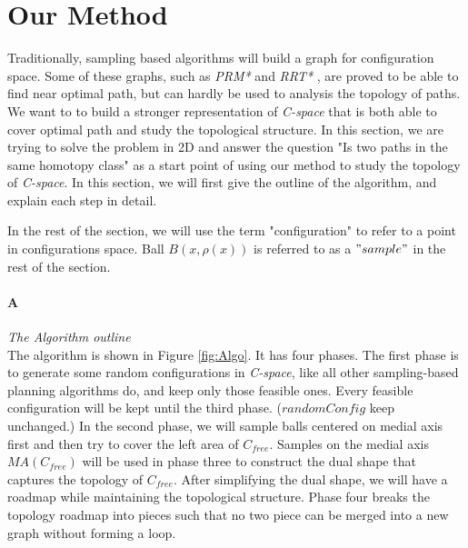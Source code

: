 \documentclass[11pt]{article}
\begin{document}
%

\section{Our Method}\label{method} 

\indent \indent Traditionally, sampling based algorithms will build a graph for configuration space. Some of these graphs, such as \emph{PRM*} and \emph{RRT*} \cite{prmstar}, are proved to be able to find near optimal path, but can hardly be used to analysis the topology of paths. We want to to build a stronger representation of \emph{C-space} that is both able to cover optimal path and study the topological structure. In this section, we are trying to solve the problem in 2D and answer the question "Is two paths in the same homotopy class" as a start point of using our method to study the topology of \emph{C-space}. In this section, we will first give the outline of the algorithm, and explain each step in detail. 

\indent In the rest of the section, we will use the term "configuration" to refer to a point in configurations space.  Ball $B(x, \rho(x))$ is referred to as a $"sample"$ in the rest of the section. 

\paragraph{A} \emph{The Algorithm outline} \hfill \\

\indent The algorithm is shown in Figure \ref{fig:Algo}. It has four phases. The first phase is to generate some random configurations in \emph{C-space}, like all other sampling-based planning algorithms do, and keep only those feasible ones. Every feasible configuration will be kept until the third phase. ($randomConfig$ keep unchanged.) In the second phase, we will sample balls centered on medial axis first and then try to cover the left area of $C_{free}$. Samples on the medial axis $MA(C_{free})$ will be used in phase three to construct the dual shape that captures the topology of $C_{free}$. After simplifying the dual shape, we will have a roadmap while maintaining the topological structure. Phase four breaks the topology roadmap into pieces such that no two piece can be merged into a new graph without forming a loop. 
\end{document}
